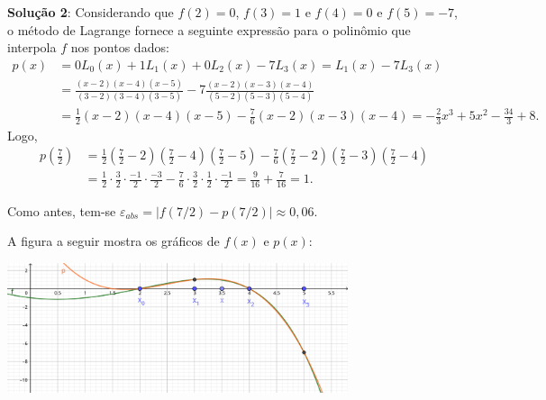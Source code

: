 \documentclass[12pt,a4paper]{article}
\begin{document}
\begin{ExerciseList}
\textbf{Solução 2}: Considerando que $f(2) = 0$, $f(3) = 1$ e $f(4) = 0$ e $f(5)=-7$, o método de Lagrange fornece a seguinte expressão para o polinômio que interpola $f$ nos pontos dados:
\begin{align*}
p(x)
  & = 0 L_0(x) + 1 L_1(x) + 0 L_2(x) - 7 L_3(x)
    = L_1(x) - 7 L_3(x) \\
  & = \frac{(x-2)(x-4)(x-5)}{(3-2)(3-4)(3-5)}
  -7 \frac{(x-2)(x-3)(x-4)}{(5-2)(5-3)(5-4)}\\
  & = \frac{1}{2}(x-2)(x-4)(x-5)
   -\frac{7}{6}(x-2)(x-3)(x-4)
    = -\frac{2}{3}x^3 + 5x^2 - \frac{34}{3} + 8.
\end{align*}
Logo,
\begin{align*}
  p\left(\frac{7}{2}\right)
  & = \frac{1}{2}\left(\frac{7}{2}-2\right)\left(\frac{7}{2}-4\right)\left(\frac{7}{2}-5\right)
    - \frac{7}{6}\left(\frac{7}{2}-2\right)\left(\frac{7}{2}-3\right)\left(\frac{7}{2}-4\right) \\
  & = \frac{1}{2}\cdot\frac{3}{2}\cdot\frac{-1}{2}\cdot\frac{-3}{2}
    - \frac{7}{6}\cdot\frac{3}{2}\cdot\frac{1}{2}\cdot\frac{-1}{2}
    = \frac{9}{16} + \frac{7}{16}
    = 1.
\end{align*}

Como antes, tem-se $\varepsilon_{abs} = |f(7/2) - p(7/2)| \approx 0,06$.

A figura a seguir mostra os gráficos de $f(x)$ e $p(x)$:

\begin{center}
  \includegraphics[width=10.0cm]{img/prova-2-cci-interpolação.pdf}
\end{center}



\end{ExerciseList}
\end{document}
